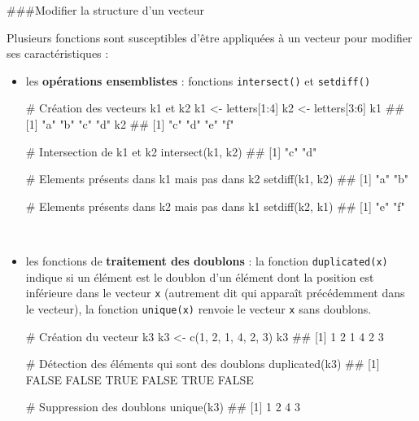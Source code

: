 \documentclass[12pt,twosided, notitlepage]{book}
\newenvironment{Shaded}{}{}
\newcommand{\CommentTok}[1]{\textcolor[rgb]{0.00,0.50,0.00}{#1}}
\newcommand{\DecValTok}[1]{#1}
\newcommand{\KeywordTok}[1]{\textcolor[rgb]{0.00,0.00,1.00}{#1}}
\newcommand{\NormalTok}[1]{#1}
\newcommand{\OperatorTok}[1]{#1}
\newcommand{\StringTok}[1]{\textcolor[rgb]{0.00,0.50,0.50}{#1}}
\renewenvironment{Shaded}{\begin{snugshade}}{\end{snugshade}}
\begin{document}
\#\#\#Modifier la structure d'un vecteur

Plusieurs fonctions sont susceptibles d'être appliquées à un vecteur
pour modifier ses caractéristiques :

\begin{itemize}
\item
  les \textbf{opérations ensemblistes} : fonctions
  \texttt{intersect()} et
  \texttt{setdiff()}

\begin{Shaded}
\begin{Highlighting}[]
\CommentTok{# Création des vecteurs k1 et k2}
\NormalTok{k1 <-}\StringTok{ }\NormalTok{letters[}\DecValTok{1}\OperatorTok{:}\DecValTok{4}\NormalTok{]}
\NormalTok{k2 <-}\StringTok{ }\NormalTok{letters[}\DecValTok{3}\OperatorTok{:}\DecValTok{6}\NormalTok{]}
\NormalTok{k1}
\NormalTok{  ## [1] "a" "b" "c" "d"}
\NormalTok{k2}
\NormalTok{  ## [1] "c" "d" "e" "f"}

\CommentTok{# Intersection de k1 et k2}
\KeywordTok{intersect}\NormalTok{(k1, k2)}
\NormalTok{  ## [1] "c" "d"}

\CommentTok{# Elements présents dans k1 mais pas dans k2}
\KeywordTok{setdiff}\NormalTok{(k1, k2)}
\NormalTok{  ## [1] "a" "b"}

\CommentTok{# Elements présents dans k2 mais pas dans k1}
\KeywordTok{setdiff}\NormalTok{(k2, k1)}
\NormalTok{  ## [1] "e" "f"}
\end{Highlighting}
\end{Shaded}
\end{itemize}

~

\begin{itemize}
\item
  les fonctions de \textbf{traitement des doublons} : la fonction
  \texttt{duplicated(x)} indique si un
  élément est le doublon d'un élément dont la position est inférieure
  dans le vecteur \texttt{x} (autrement dit qui apparaît précédemment
  dans le vecteur), la fonction
  \texttt{unique(x)} renvoie le vecteur
  \texttt{x} sans doublons.

\begin{Shaded}
\begin{Highlighting}[]
\CommentTok{# Création du vecteur k3}
\NormalTok{k3 <-}\StringTok{ }\KeywordTok{c}\NormalTok{(}\DecValTok{1}\NormalTok{, }\DecValTok{2}\NormalTok{, }\DecValTok{1}\NormalTok{, }\DecValTok{4}\NormalTok{, }\DecValTok{2}\NormalTok{, }\DecValTok{3}\NormalTok{)}
\NormalTok{k3}
\NormalTok{  ## [1] 1 2 1 4 2 3}

\CommentTok{# Détection des éléments qui sont des doublons}
\KeywordTok{duplicated}\NormalTok{(k3)}
\NormalTok{  ## [1] FALSE FALSE  TRUE FALSE  TRUE FALSE}

\CommentTok{# Suppression des doublons}
\KeywordTok{unique}\NormalTok{(k3)}
\NormalTok{  ## [1] 1 2 4 3}
\end{Highlighting}
\end{Shaded}
\end{itemize}
\end{document}
